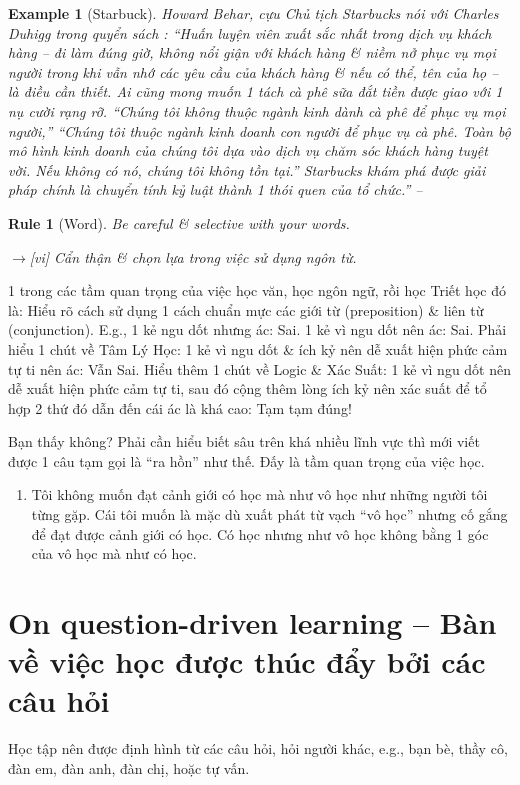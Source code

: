\documentclass[12pt,twoside]{book}
\newtheorem{example}{Example}
\newtheorem{Rule}{Rule}
\begin{document}
\begin{example}[Starbuck]
	Howard Behar, cựu Chủ tịch Starbucks nói với {\rm Charles Duhigg} trong quyển sách {\rm\cite{Duhigg_habit}}: ``Huấn luyện viên xuất sắc nhất trong dịch vụ khách hàng -- đi làm đúng giờ, không nổi giận với khách hàng \& niềm nở phục vụ mọi người trong khi vẫn nhớ các yêu cầu của khách hàng \& nếu có thể, tên của họ -- là điều cần thiết. Ai cũng mong muốn 1 tách cà phê sữa đắt tiền được giao với 1 nụ cười rạng rỡ. ``Chúng tôi không thuộc ngành kinh dành cà phê để phục vụ mọi người,'' ``Chúng tôi thuộc ngành kinh doanh con người để phục vụ cà phê. Toàn bộ mô hình kinh doanh của chúng tôi dựa vào dịch vụ chăm sóc khách hàng tuyệt vời. Nếu không có nó, chúng tôi không tồn tại.'' Starbucks khám phá được giải pháp chính là chuyển tính kỷ luật thành 1 thói quen của tổ chức.'' -- {\rm\cite[p. 220]{Duhigg_habit_VN}}
\end{example}

\begin{Rule}[Word]
	Be careful \& selective with your words.
	
	{\sf[en]$\to$[vi]} Cẩn thận \& chọn lựa trong việc sử dụng ngôn từ.
\end{Rule}
1 trong các tầm quan trọng của việc học văn, học ngôn ngữ, rồi học Triết học đó là: Hiểu rõ cách sử dụng 1 cách chuẩn mực các giới từ (preposition) \& liên từ (conjunction). E.g., 1 kẻ ngu dốt nhưng ác: Sai. 1 kẻ vì ngu dốt nên ác: Sai. Phải hiểu 1 chút về Tâm Lý Học: 1 kẻ vì ngu dốt \& ích kỷ nên dễ xuất hiện phức cảm tự ti nên ác: Vẫn Sai. Hiểu thêm 1 chút về Logic \& Xác Suất: 1 kẻ vì ngu dốt nên dễ xuất hiện phức cảm tự ti, sau đó cộng thêm lòng ích kỷ nên xác suất để tổ hợp 2 thứ đó dẫn đến cái ác là khá cao: Tạm tạm đúng!

Bạn thấy không? Phải cần hiểu biết sâu trên khá nhiều lĩnh vực thì mới viết được 1 câu tạm gọi là ``ra hồn'' như thế. Đấy là tầm quan trọng của việc học.
\begin{enumerate}
	\item Tôi không muốn đạt cảnh giới có học mà như vô học như những người tôi từng gặp. Cái tôi muốn là mặc dù xuất phát từ vạch ``vô học'' nhưng cố gắng để đạt được cảnh giới có học. Có học nhưng như vô học không bằng 1 góc của vô học mà như có học.
\end{enumerate}

\section{On question-driven learning -- Bàn về việc học được thúc đẩy bởi các câu hỏi}
Học tập nên được định hình từ các câu hỏi, hỏi người khác, e.g., bạn bè, thầy cô, đàn em, đàn anh, đàn chị, hoặc tự vấn.
\end{document}
